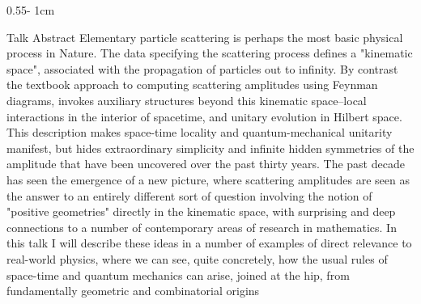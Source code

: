 \documentclass{psuposter}
\begin{document}
\begin{frame}
\begin{columns}[onlytextwidth]
\begin{column}{0.55\textwidth - 1cm}
    \begin{block}{Talk Abstract}
        Elementary particle scattering is perhaps the most basic physical process in Nature. The data specifying the scattering process defines a "kinematic space", associated with the propagation of particles out to infinity. By contrast the textbook approach to computing scattering amplitudes using Feynman diagrams, invokes auxiliary structures beyond this kinematic space--local interactions in the interior of spacetime, and unitary evolution in Hilbert space. This description makes space-time locality and quantum-mechanical unitarity manifest, but hides extraordinary simplicity and infinite hidden symmetries of the amplitude that have been uncovered over the past thirty years. The past decade has seen the emergence of a new picture, where scattering amplitudes are seen as the answer to an entirely different sort of question involving  the notion of "positive geometries" directly in the kinematic space, with surprising and deep connections to a number of contemporary areas of research in mathematics. In this talk I will describe these ideas in a number of examples of direct relevance to real-world physics, where we can see, quite concretely, how the usual rules of space-time and quantum mechanics can arise, joined at the hip, from fundamentally geometric and combinatorial origins
    \end{block}


\end{column}
\end{columns}
\end{frame}
\end{document}
